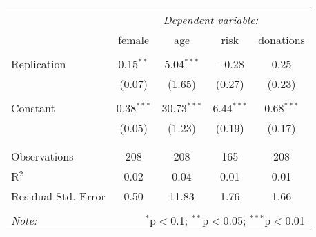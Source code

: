 \documentclass[11pt,]{article}
\begin{document}
\begin{table}[!htbp] \centering 
  \caption{} 
  \label{} 
\begin{tabular}{@{\extracolsep{5pt}}lcccc} 
\\[-1.8ex]\hline 
\hline \\[-1.8ex] 
 & \multicolumn{4}{c}{\textit{Dependent variable:}} \\ 
\cline{2-5} 
 & female & age & risk & donations \\ 
\hline \\[-1.8ex] 
 Replication & 0.15$^{**}$ & 5.04$^{***}$ & $-$0.28 & 0.25 \\ 
  & (0.07) & (1.65) & (0.27) & (0.23) \\ 
  & & & & \\ 
 Constant & 0.38$^{***}$ & 30.73$^{***}$ & 6.44$^{***}$ & 0.68$^{***}$ \\ 
  & (0.05) & (1.23) & (0.19) & (0.17) \\ 
  & & & & \\ 
\hline \\[-1.8ex] 
Observations & 208 & 208 & 165 & 208 \\ 
R$^{2}$ & 0.02 & 0.04 & 0.01 & 0.01 \\ 
Residual Std. Error & 0.50 & 11.83 & 1.76 & 1.66 \\ 
\hline 
\hline \\[-1.8ex] 
\textit{Note:}  & \multicolumn{4}{r}{$^{*}$p$<$0.1; $^{**}$p$<$0.05; $^{***}$p$<$0.01} \\ 
\end{tabular} 
\end{table}
\end{document}
